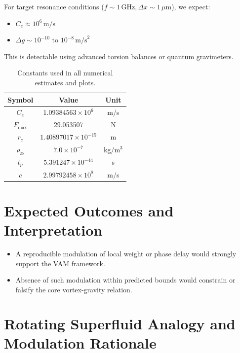 \documentclass[12pt]{article}
\begin{document}
    For target resonance conditions (\( f \sim 1 \, \text{GHz}, \Delta x \sim 1 \, \mu\text{m} \)), we expect:
    \begin{itemize}
        \item \( C_e \approx 10^6 \, \text{m/s} \)
        \item \( \Delta g \sim 10^{-10} \text{ to } 10^{-8} \, \text{m/s}^2 \)
    \end{itemize}
    This is detectable using advanced torsion balances or quantum gravimeters.

    \begin{table}[h!]
        \centering
        \begin{tabular}{|c|c|c|}
            \hline
            \textbf{Symbol} & \textbf{Value} & \textbf{Unit} \\
            \hline
            \( C_e \) & \( 1.09384563 \times 10^6 \) & m/s \\
            \( F_{\text{max}} \) & 29.053507 & N \\
            \( r_c \) & \( 1.40897017 \times 10^{-15} \) & m \\
            \( \rho_\text{\ae} \) & \( 7.0 \times 10^{-7} \) & kg/m$^3$ \\
            \( t_p \) & \( 5.391247 \times 10^{-44} \) & s \\
            \( c \) & \( 2.99792458 \times 10^8 \) & m/s \\
            \hline
        \end{tabular}
        \caption{Constants used in all numerical estimates and plots.}
    \end{table}


    \section*{Expected Outcomes and Interpretation}
    \begin{itemize}
        \item A reproducible modulation of local weight or phase delay would strongly support the VAM framework.
        \item Absence of such modulation within predicted bounds would constrain or falsify the core vortex-gravity relation.
    \end{itemize}

    \section*{Rotating Superfluid Analogy and Modulation Rationale}
\end{document}
